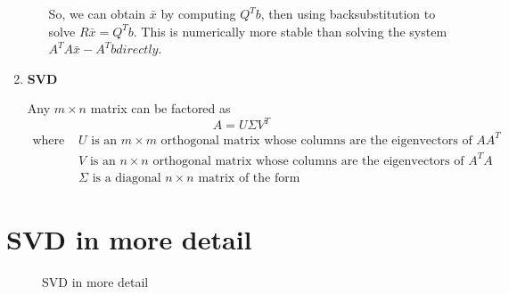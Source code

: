 \begin{enumerate}[label=(\roman*)]
\begin{enumerate}[label=(\alph*)]
        So, we can obtain $\bar{x}$ by computing $Q^Tb$, then using backsubstitution to solve $R\bar{x} = Q^Tb$. This is numerically more stable than solving the system $A^TA\bar{x} - A^Tb directly$.
    \end{enumerate}
    
    \item \textbf{SVD}
    
    Any $m \times n$ matrix can be factored as 
    \[
        A = U \Sigma V^T
    \]
    \begin{align*}
        \text{where } &U \text{ is an $m \times m$ orthogonal matrix whose columns are the eigenvectors of $AA^T$} \\
        &V \text{ is an $n \times n$ orthogonal matrix whose columns are the eigenvectors of $A^TA$} \\
        &\Sigma \text{ is a diagonal $n \times n$ matrix of the form} 
    \end{align*}
    
\end{enumerate}



\section{SVD in more detail}

\begin{figure}
  \centering
  \label{fig:linear-2}
  \caption{SVD in more detail}
  \resizebox{\columnwidth}{!}{
    
  }
\end{figure}


